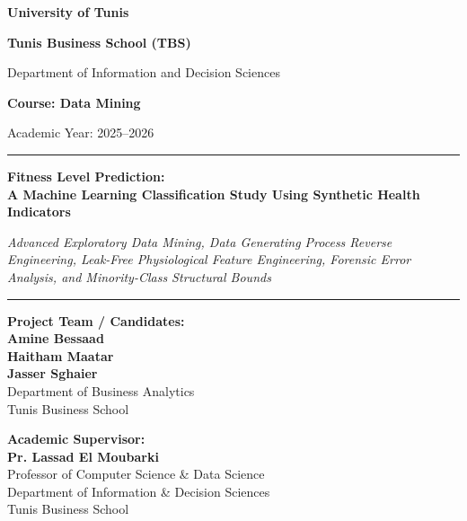 \documentclass[11pt,a4paper]{article}
\begin{document}
\begin{titlepage}
\centering
\vspace*{0.8cm}

{\Large\bfseries\color{tbsblue} University of Tunis \par}
\vspace{0.15cm}
{\large\bfseries\color{tbsblue} Tunis Business School (TBS) \par}
\vspace{0.12cm}
{\normalsize Department of Information and Decision Sciences \par}
\vspace{0.10cm}
{\large\bfseries Course: Data Mining \par}
\vspace{0.08cm}
{\small Academic Year: 2025--2026 \par}

\vspace{1.5cm}
\noindent\rule{\linewidth}{1.2pt}
\vspace{0.35cm}

{\LARGE\bfseries Fitness Level Prediction:\\[4pt]
A Machine Learning Classification Study Using Synthetic Health Indicators \par}
\vspace{0.35cm}
{\large\itshape Advanced Exploratory Data Mining, Data Generating Process Reverse Engineering, Leak-Free Physiological Feature Engineering, Forensic Error Analysis, and Minority-Class Structural Bounds \par}

\vspace{0.35cm}
\noindent\rule{\linewidth}{1.2pt}

\vspace{2.0cm}

\begin{minipage}[t]{0.48\textwidth}
\textbf{Project Team / Candidates:}\\[4pt]
\textbf{Amine Bessaad}\\
\textbf{Haitham Maatar}\\
\textbf{Jasser Sghaier}\\[6pt]
\small Department of Business Analytics\\
\small Tunis Business School
\end{minipage}
\hfill
\begin{minipage}[t]{0.48\textwidth}
\raggedleft
\textbf{Academic Supervisor:}\\[4pt]
\textbf{Pr. Lassad El Moubarki}\\
\small Professor of Computer Science \& Data Science\\
\small Department of Information \& Decision Sciences\\
\small Tunis Business School
\end{minipage}

\vfill
\vspace*{0.8cm}
\end{titlepage}
\end{document}
